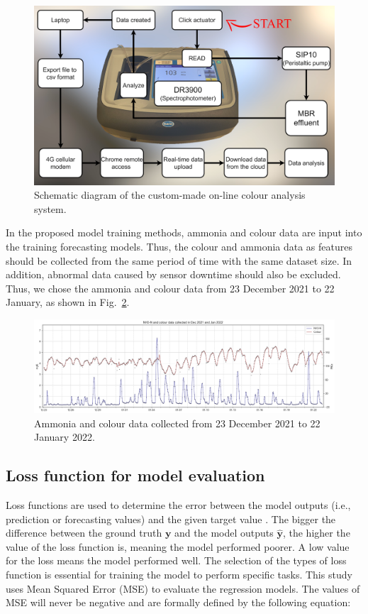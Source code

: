 \begin{figure}[h]
    \centering
    \includegraphics[width=0.8\columnwidth]{imgs/instrument/colour-sampler.png}
    \caption{Schematic diagram of the custom-made on-line colour analysis system.}
    \label{fig:diagram-colour-analysis}
 \end{figure}

 In the proposed model training methods, ammonia and colour data are input into the training forecasting models. Thus, the colour and ammonia data as features should be collected from the same period of time with the same dataset size. In addition, abnormal data caused by sensor downtime should also be excluded. Thus, we chose the ammonia and colour data from 23 December 2021 to 22 January, as shown in Fig.~\ref{fig:nh3-color-data}.

\begin{figure}[h]
    \centering
    \includegraphics[width=1.0\columnwidth]{imgs/results/data.png}
    \caption{Ammonia and colour data collected from 23 December 2021 to 22  January 2022.}
    \label{fig:nh3-color-data}
\end{figure}

\subsection{Loss function for model evaluation}
Loss functions are used to determine the error between the model outputs (i.e., prediction or forecasting values) and the given target value \citep{deepaiLossFunction2022}. The bigger the difference between the ground truth $\bm{y}$ and the model outputs $\bm{\hat{y}}$, the higher the value of the loss function is, meaning the model performed poorer. A low value for the loss means the model performed well. The selection of the types of loss function is essential for training the model to perform specific tasks. This study uses Mean Squared Error (MSE) to evaluate the regression models. The values of MSE will never be negative and are formally defined by the following equation:

